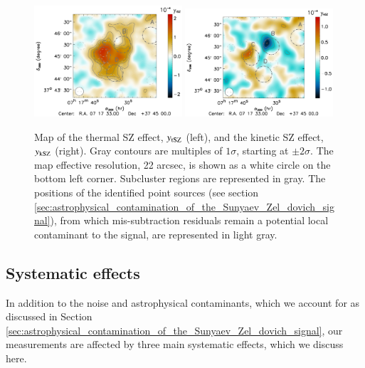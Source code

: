 \documentclass[twocolumn,traditabstract]{aa}
\begin{document}
\begin{figure}[h]
\centering
\includegraphics[width=0.49\textwidth]{Figure/MACSJ0717_tSZ_map.pdf}
\includegraphics[width=0.49\textwidth]{Figure/MACSJ0717_kSZ_map.pdf}
\caption{\footnotesize{Map of the thermal SZ effect, $y_{\rm tSZ}$ (left), and the kinetic SZ effect, $y_{\rm kSZ}$ (right). Gray contours are multiples of $1 \sigma$, starting at $\pm 2 \sigma$. The map effective resolution, 22 arcsec, is shown as a white circle on the bottom left corner. Subcluster regions are represented in gray. The positions of the identified point sources (see section \ref{sec:astrophysical_contamination_of_the_Sunyaev_Zel_dovich_signal}), from which mis-subtraction residuals remain a potential local contaminant to the signal, are represented in light gray.}}
\label{fig:tSZ_kSZ_maps}
\end{figure}

\subsection{Systematic effects}
In addition to the noise and astrophysical contaminants, which we account for as discussed in Section \ref{sec:astrophysical_contamination_of_the_Sunyaev_Zel_dovich_signal}, our measurements are affected by three main systematic effects, which we discuss here.
\end{document}
